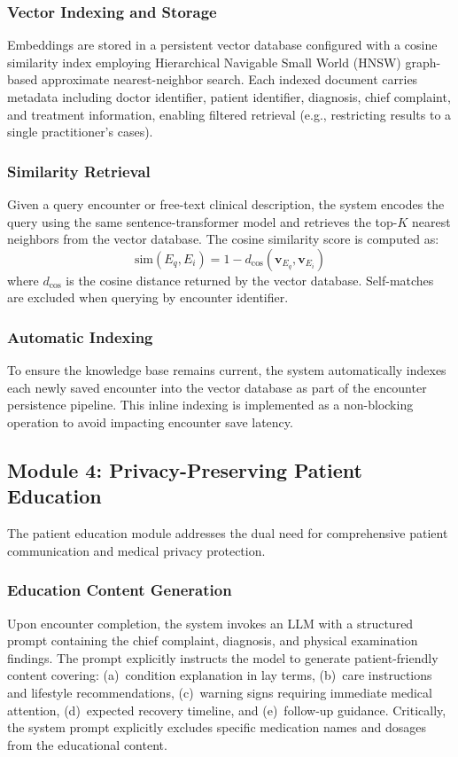 \documentclass[conference]{IEEEtran}
\begin{document}
\subsubsection{Vector Indexing and Storage}
Embeddings are stored in a persistent vector database configured with a cosine similarity index employing Hierarchical Navigable Small World (HNSW) graph-based approximate nearest-neighbor search. Each indexed document carries metadata including doctor identifier, patient identifier, diagnosis, chief complaint, and treatment information, enabling filtered retrieval (e.g., restricting results to a single practitioner's cases).

\subsubsection{Similarity Retrieval}
Given a query encounter or free-text clinical description, the system encodes the query using the same sentence-transformer model and retrieves the top-$K$ nearest neighbors from the vector database. The cosine similarity score is computed as:
\begin{equation}
\text{sim}(E_q, E_i) = 1 - d_{\cos}(\mathbf{v}_{E_q}, \mathbf{v}_{E_i})
\label{eq:similarity}
\end{equation}
where $d_{\cos}$ is the cosine distance returned by the vector database. Self-matches are excluded when querying by encounter identifier.

\subsubsection{Automatic Indexing}
To ensure the knowledge base remains current, the system automatically indexes each newly saved encounter into the vector database as part of the encounter persistence pipeline. This inline indexing is implemented as a non-blocking operation to avoid impacting encounter save latency.

\subsection{Module 4: Privacy-Preserving Patient Education}

The patient education module addresses the dual need for comprehensive patient communication and medical privacy protection.

\subsubsection{Education Content Generation}
Upon encounter completion, the system invokes an LLM with a structured prompt containing the chief complaint, diagnosis, and physical examination findings. The prompt explicitly instructs the model to generate patient-friendly content covering: (a)~condition explanation in lay terms, (b)~care instructions and lifestyle recommendations, (c)~warning signs requiring immediate medical attention, (d)~expected recovery timeline, and (e)~follow-up guidance. Critically, the system prompt explicitly excludes specific medication names and dosages from the educational content.
\end{document}
